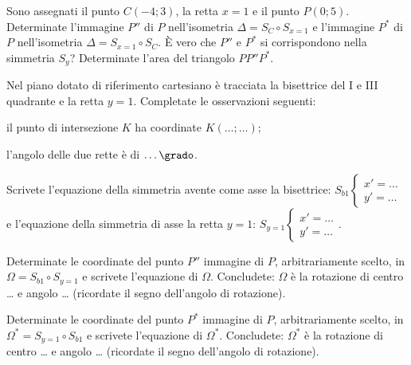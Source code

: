 % 
% 

\begin{esercizio}
  \label{ese:8.65} %
  Sono assegnati il punto $C(-4;3)$, la retta $x=1$ e il punto 
  $P(0;5)$. Determinate l'immagine $P''$ di $P$ nell'isometria 
  $\Delta=S_{C}\circ S_{x=1}$ e l'immagine $P^*$ di $P$ nell'isometria 
  $\Delta=S_{x=1}\circ S_{C}$. \`E vero che $P''$ e $P^*$ si 
  corrispondono nella simmetria $S_y$? Determinate l'area del triangolo 
  $PP''P^*$.
\end{esercizio}

\begin{esercizio}
  \label{ese:8.69} %
  Nel piano dotato di riferimento cartesiano è tracciata la bisettrice 
  del I e III quadrante e la 
  retta $y=1$. Completate le osservazioni seguenti:
  \begin{enumeratea}
    \item il punto di intersezione $K$ ha coordinate 
    $K(\ldots{};\ldots{})$;
    \item l'angolo delle due rette è di $\ldots{}\grado$.
  \end{enumeratea}
  Scrivete l'equazione della simmetria avente come asse la bisettrice: 
  $S_{b1}\begin{cases}x'=\ldots{}\\y'=\ldots{}\end{cases}$ e 
  l'equazione della simmetria di asse la retta $y=1$: 
  $S_{y=1}\begin{cases}x'=\ldots{}\\y'=\ldots{}\end{cases}$.

  Determinate le coordinate del punto $P''$ immagine di $P$, 
  arbitrariamente scelto, in $\Omega = S_{b1} \circ S_{y=1}$ e scrivete 
  l'equazione di $\Omega$.
  Concludete: $\Omega$ è la rotazione di centro \ldots{} e angolo 
  \ldots{} (ricordate il segno dell'angolo di rotazione).

  Determinate le coordinate del punto $P^*$ immagine di $P$, 
  arbitrariamente scelto, in $\Omega^*=S_{y=1} \circ S_{b1}$ e scrivete 
  l'equazione di $\Omega^*$.
  Concludete: $\Omega^*$ è la rotazione di centro \ldots{} e angolo 
  \ldots{} (ricordate il segno dell'angolo di rotazione).
\end{esercizio}

